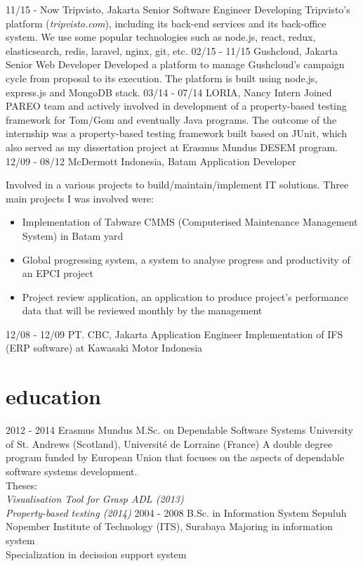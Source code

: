 \documentclass[]{friggeri-cv}
\begin{document}
\begin{entrylist}
  \entry
    {11/15 - Now}
    {Tripvisto, Jakarta}
    {Senior Software Engineer}
	{Developing Tripvisto's platform (\emph{tripvisto.com}), including its back-end services and its back-office system.
	We use some popular technologies such as node.js, react, redux, elasticsearch, redis, laravel, nginx, git, etc.}
  \entry
	{02/15 - 11/15}
	{Gushcloud, Jakarta}
	{Senior Web Developer}
	{Developed a platform to manage Gushcloud's campaign cycle from proposal to its execution. The platform
	is built using node.js, express.js and MongoDB stack.}
  \entry
	{03/14 - 07/14}
	{LORIA, Nancy}
	{Intern}
	{Joined PAREO team and actively involved in development of a property-based testing framework for Tom/Gom
	and eventually Java programs. The outcome of the internship was a property-based testing framework built based
	on JUnit, which also served as my dissertation project at Erasmus Mundus DESEM program.}
  \entry
	{12/09 - 08/12}
	{McDermott Indonesia, Batam}
	{Application Developer}
	{Involved in a various projects to build/maintain/implement IT solutions. Three main projects I was involved
	were:
	\begin{itemize}
	  \item Implementation of Tabware CMMS (Computerised Maintenance Management System) in Batam yard
	  \item Global progressing system, a system to analyse progress and productivity of an EPCI project
	  \item Project review application, an application to produce project's performance data that will be reviewed monthly by the management
	\end{itemize}}
  \entry
	{12/08 - 12/09}
	{PT. CBC, Jakarta}
	{Application Engineer}
	{Implementation of IFS (ERP software) at Kawasaki Motor Indonesia}
\end{entrylist}

\section{education}

\begin{entrylist}
  \entry
	{2012 - 2014}
	{Erasmus Mundus M.Sc. on Dependable Software Systems}
	{University of St. Andrews (Scotland), Universit\'{e} de Lorraine (France)}
	{A double degree program funded by European Union that focuses on the aspects
	of dependable software systems development.\\
	Theses:\\
	\emph{Visualisation Tool for Grasp ADL (2013)}\\
	\emph{Property-based testing (2014)}}
  \entry
	{2004 - 2008}
	{B.Sc. in Information System}
	{Sepuluh Nopember Institute of Technology (ITS), Surabaya}
	{Majoring in information system\\
	Specialization in decission support system}
\end{entrylist}
\end{document}
